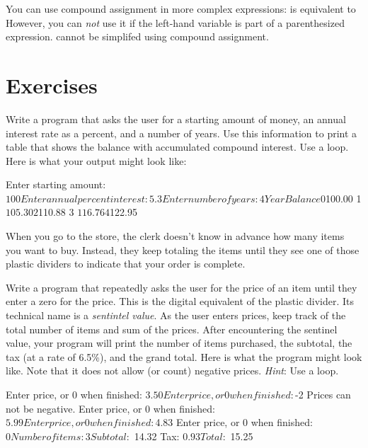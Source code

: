 You can use compound assignment in more complex expressions:
 is equivalent to  However, you can {\em not} use it if the left-hand variable is part of a parenthesized expression.  cannot be simplifed using compound assignment.

\section{Exercises}

\begin{exercise}
Write a program that asks the user for a starting amount of money, an annual interest rate as a percent, and a number of years. Use this information to print a table that shows the balance with accumulated compound interest. Use a  loop. Here is what your output might look like:

\begin{stdout}
Enter starting amount: $100
Enter annual percent interest: 5.3
Enter number of years: 4
Year  Balance
0     $100.00
1     $105.30
2     $110.88
3     $116.76
4     $122.95
\end{stdout}

\end{exercise}
\begin{exercise}
When you go to the store, the clerk doesn't know in advance how many items you want to buy. Instead, they keep totaling the items until they see one of those plastic dividers to indicate that your order is complete.

Write a program that repeatedly asks the user for the price of an item until they enter a zero for the price. This is the digital equivalent of the plastic divider. Its technical name is a {\em sentintel value}. As the user enters prices, keep track of the total number of items and sum of the prices.  After encountering the sentinel value, your program will print the number of items purchased, the subtotal, the tax (at a rate of 6.5\%), and the grand total. Here is what the program might look like. Note that it does not allow (or count) negative prices. {\em Hint}: Use a  loop.

\begin{stdout}
Enter price, or 0 when finished: $3.50    
Enter price, or 0 when finished: $-2
Prices can not be negative.
Enter price, or 0 when finished: $5.99
Enter price, or 0 when finished: $4.83
Enter price, or 0 when finished: $0

Number of items: 3
Subtotal:  $   14.32
Tax:       $    0.93
Total:     $   15.25
\end{stdout}
\end{exercise}


